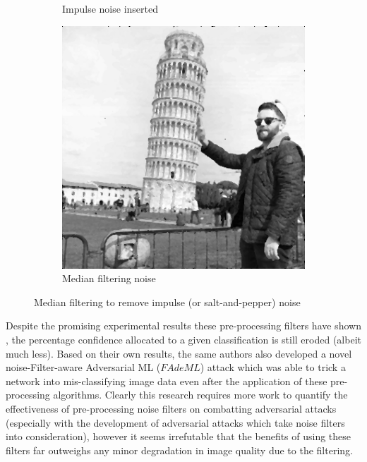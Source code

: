 \begin{figure}[h!]
\begin{subfigure}{.3\textwidth}
		\caption{Impulse noise inserted}
		\label{fig: LAPLAR2}
	\end{subfigure}
	\begin{subfigure}{.3\textwidth}
		\includegraphics[width=\textwidth]{Ifiltered.png}
		\caption{Median filtering noise}
		\label{fig: LAPLAR3}
	\end{subfigure}
	\caption{Median filtering to remove impulse (or salt-and-pepper) noise}
\end{figure}
Despite the promising experimental results these pre-processing filters have shown \cite{khalid2019fademl}, the percentage confidence allocated to a given classification is still eroded (albeit much less). Based on their own results, the same authors also developed a novel noise-Filter-aware Adversarial ML ($FAdeML$) attack which was able to trick a network into mis-classifying image data even after the application of these pre-processing algorithms. Clearly this research requires more work to quantify the effectiveness of pre-processing noise filters on combatting adversarial attacks (especially with the development of adversarial attacks which take noise filters into consideration), however it seems irrefutable that the benefits of using these filters far outweighs any minor degradation in image quality due to the filtering.




